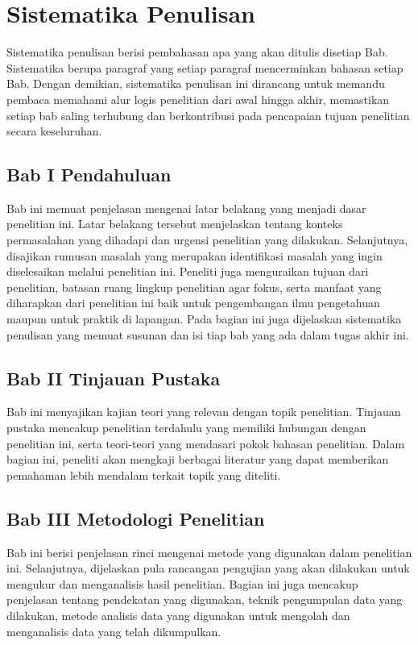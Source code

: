 \section{Sistematika Penulisan} \label{I.Sistematika}
Sistematika penulisan berisi pembahasan apa yang akan ditulis disetiap Bab. Sistematika  berupa paragraf yang setiap paragraf mencerminkan bahasan setiap Bab. Dengan demikian, sistematika penulisan ini dirancang untuk memandu pembaca memahami alur logis penelitian dari awal hingga akhir, memastikan setiap bab saling terhubung dan berkontribusi pada pencapaian tujuan penelitian secara keseluruhan. \par
\subsection{Bab I Pendahuluan}
Bab ini memuat penjelasan mengenai latar belakang yang menjadi dasar penelitian ini. Latar belakang tersebut menjelaskan tentang konteks permasalahan yang dihadapi dan urgensi penelitian yang dilakukan. Selanjutnya, disajikan rumusan masalah yang merupakan identifikasi masalah yang ingin diselesaikan melalui penelitian ini. Peneliti juga menguraikan tujuan dari penelitian, batasan ruang lingkup penelitian agar fokus, serta manfaat yang diharapkan dari penelitian ini baik untuk pengembangan ilmu pengetahuan maupun untuk praktik di lapangan. Pada bagian ini juga dijelaskan sistematika penulisan yang memuat susunan dan isi tiap bab yang ada dalam tugas akhir ini.

\subsection{Bab II Tinjauan Pustaka}
Bab ini menyajikan kajian teori yang relevan dengan topik penelitian. Tinjauan pustaka mencakup penelitian terdahulu yang memiliki hubungan dengan penelitian ini, serta teori-teori yang mendasari pokok bahasan penelitian. Dalam bagian ini, peneliti akan mengkaji berbagai literatur yang dapat memberikan pemahaman lebih mendalam terkait topik yang diteliti.

\subsection{Bab III Metodologi Penelitian}
Bab ini berisi penjelasan rinci mengenai metode yang digunakan dalam penelitian ini. Selanjutnya, dijelaskan pula rancangan pengujian yang akan dilakukan untuk mengukur dan menganalisis hasil penelitian. Bagian ini juga mencakup penjelasan tentang  pendekatan yang digunakan, teknik pengumpulan data yang dilakukan, metode analisis data yang digunakan untuk mengolah dan menganalisis data yang telah dikumpulkan.

